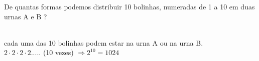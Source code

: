 \begin{ex}
 De quantas formas podemos distribuir 10 bolinhas, numeradas de 1 a 10 em duas urnas A e B ?
   \begin{sol}
     \phantom{A} \\
    cada uma das 10 bolinhas podem estar na urna A ou na urna B.  \\
     $ 2\cdot2\cdot2\cdot2..... $ (10 vezes) $\Longrightarrow 2^{10}=1024$ 
   \end{sol}
\end{ex}